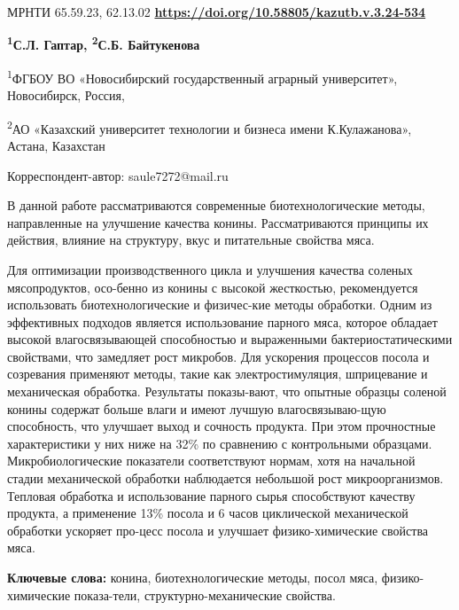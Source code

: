 \newpage
МРНТИ 65.59.23, 62.13.02
\hfill {\bfseries \href{https://doi.org/10.58805/kazutb.v.3.24-534}{https://doi.org/10.58805/kazutb.v.3.24-534}}

\begin{center}

{\bfseries \textsuperscript{1}С.Л. Гаптар, \textsuperscript{2}С.Б.
Байтукенова\envelope}

\textsuperscript{1}ФГБОУ ВО «Новосибирский государственный аграрный
университет», Новосибирск, Россия,

\textsuperscript{2}АО «Казахский университет технологии и бизнеса имени
К.Кулажанова», Астана, Казахстан
\end{center}

\envelope Корреспондент-автор: saule7272@mail.ru\vspace{0.5cm}

В данной работе рассматриваются современные биотехнологические методы,
направленные на улучшение качества конины. Рассматриваются принципы их
действия, влияние на структуру, вкус и питательные свойства мяса.

Для оптимизации производственного цикла и улучшения качества соленых
мясопродуктов, осо-бенно из конины с высокой жесткостью, рекомендуется
использовать биотехнологические и физичес-кие методы обработки. Одним из
эффективных подходов является использование парного мяса, которое
обладает высокой влагосвязывающей способностью и выраженными
бактериостатическими свойствами, что замедляет рост микробов. Для
ускорения процессов посола и созревания применяют методы, такие как
электростимуляция, шприцевание и механическая обработка. Результаты
показы-вают, что опытные образцы соленой конины содержат больше влаги и
имеют лучшую влагосвязываю-щую способность, что улучшает выход и сочность
продукта. При этом прочностные характеристики у них ниже на 32\% по
сравнению с контрольными образцами. Микробиологические показатели
соответствуют нормам, хотя на начальной стадии механической обработки
наблюдается небольшой рост микроорганизмов. Тепловая обработка и
использование парного сырья способствуют качеству продукта, а применение
13\% посола и 6 часов циклической механической обработки ускоряет
про-цесс посола и улучшает физико-химические свойства мяса.

{\bfseries Ключевые слова:} конина, биотехнологические методы, посол мяса,
физико-химические показа-тели, структурно-механические свойства.

